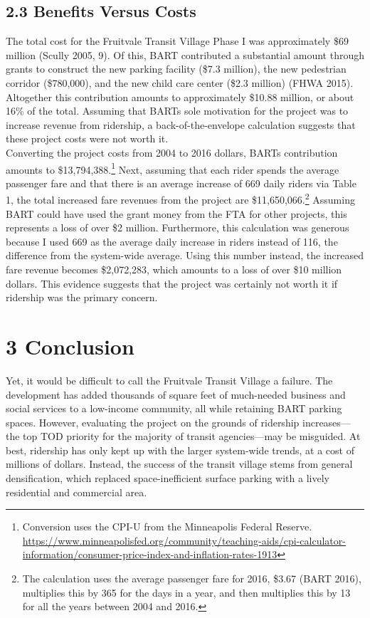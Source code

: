 \documentclass{article}
\begin{document}
\subsection*{2.3 Benefits Versus Costs}

The total cost for the Fruitvale Transit Village Phase I was approximately \$69 million (Scully 2005, 9). Of this, BART contributed a substantial amount through grants to construct the new parking facility (\$7.3 million), the new pedestrian corridor (\$780,000), and the new child care center (\$2.3 million) (FHWA 2015). Altogether this contribution amounts to approximately \$10.88 million, or about 16\% of the total. Assuming that BART\textquotesingle s sole motivation for the project was to increase revenue from ridership, a back-of-the-envelope calculation suggests that these project costs were not worth it.\\

\noindent
 Converting the project costs from 2004 to 2016 dollars, BART\textquotesingle s contribution amounts to \$13,794,388.\footnote{Conversion uses the CPI-U from the Minneapolis Federal Reserve. \url{https://www.minneapolisfed.org/community/teaching-aids/cpi-calculator-information/consumer-price-index-and-inflation-rates-1913}}  Next, assuming that each rider spends the average passenger fare and that there is an average increase of 669 daily riders via Table 1, the total increased fare revenues from the project are \$11,650,066.\footnote{The calculation uses the average passenger fare for 2016, \$3.67 (BART 2016), multiplies this by 365 for the days in a year, and then multiplies this by 13 for all the years between 2004 and 2016.}   Assuming BART could have used the grant money from the FTA for other projects, this represents a loss of over \$2 million.  Furthermore, this calculation was generous because I used 669 as the average daily increase in riders instead of 116, the difference from the system-wide average. Using this number instead, the increased fare revenue becomes  \$2,072,283, which amounts to a loss of over \$10 million dollars. This evidence suggests that the project was certainly not worth it if ridership was the primary concern. \\

\section*{3 Conclusion}

Yet, it would be difficult to call the Fruitvale Transit Village a failure. The development has added thousands of square feet of much-needed business and social services to a low-income community, all while retaining BART parking spaces. However, evaluating the project on the grounds of ridership increases---the top TOD priority for the majority of transit agencies---may be misguided. At best, ridership has only kept up with the larger system-wide trends, at a cost of millions of dollars. Instead, the success of the transit village stems from general densification, which replaced space-inefficient surface parking with a lively residential and commercial area. \\
\end{document}
